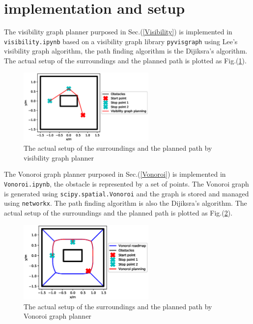 \documentclass[12pt]{article}
\begin{document}
\section{implementation and setup}

The visibility graph planner purposed in Sec.(\ref{Visibility}) is implemented in \texttt{visibility.ipynb} based on a visibility graph library \texttt{pyvisgraph} using Lee's visibility graph algorithm, the path finding algorithm is the Dijiksra's algorithm. The actual setup of the surroundings and the planned path is plotted as Fig.(\ref{vis}).

\begin{figure}[htbp]
\centering
\includegraphics[width=0.6\textwidth]{../figures/visibility_graph_planning.eps}
\caption{The actual setup of the surroundings and the planned path by visibility graph planner}\label{vis}
\end{figure}

The Vonoroi graph planner purposed in Sec.(\ref{Vonoroi}) is implemented in \texttt{Vonoroi.ipynb}, the obstacle is represented by a set of points. The Vonoroi graph is generated using \texttt{scipy.spatial.Vonoroi} and the graph is stored and managed using \texttt{networkx}. The path finding algorithm is also the Dijiksra's algorithm. The actual setup of the surroundings and the planned path is plotted as Fig.(\ref{vo}).

\begin{figure}[htbp]
\centering
\includegraphics[width=0.6\textwidth]{../figures/vonoroi_planning.eps}
\caption{The actual setup of the surroundings and the planned path by Vonoroi graph planner}\label{vo}
\end{figure}
\end{document}
